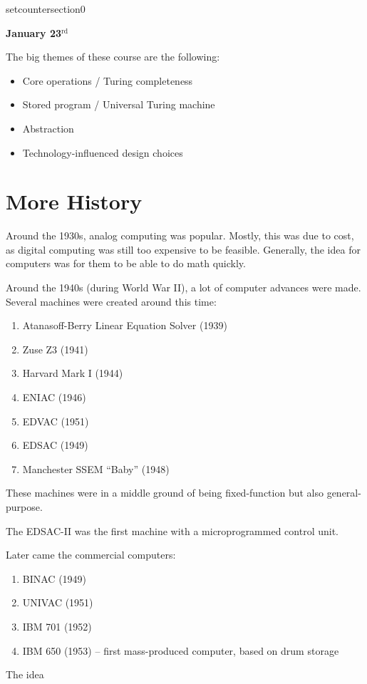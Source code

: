 setcounter{section}{0}

\textbf{January 23$^{\text{rd}}$}

The big themes of these course are the following:
\begin{itemize}
    \item Core operations / Turing completeness
    \item Stored program / Universal Turing machine
    \item Abstraction
    \item Technology-influenced design choices
\end{itemize}

\section{More History}
Around the 1930s, analog computing was popular.
Mostly, this was due to cost, as digital computing was still too expensive to be feasible.
Generally, the idea for computers was for them to be able to do math quickly.

Around the 1940s (during World War II), a lot of computer advances were made.
Several machines were created around this time:
\begin{enumerate}
    \item Atanasoff-Berry Linear Equation Solver (1939)
    \item Zuse Z3 (1941)
    \item Harvard Mark I (1944)
    \item ENIAC (1946)
    \item EDVAC (1951)
    \item EDSAC (1949)
    \item Manchester SSEM ``Baby'' (1948)
\end{enumerate}
These machines were in a middle ground of being fixed-function but also general-purpose.

The EDSAC-II was the first machine with a microprogrammed control unit.


Later came the commercial computers:
\begin{enumerate}
    \item BINAC (1949)
    \item UNIVAC (1951)
    \item IBM 701 (1952)
    \item IBM 650 (1953) -- first mass-produced computer, based on drum storage
\end{enumerate}
The idea 

